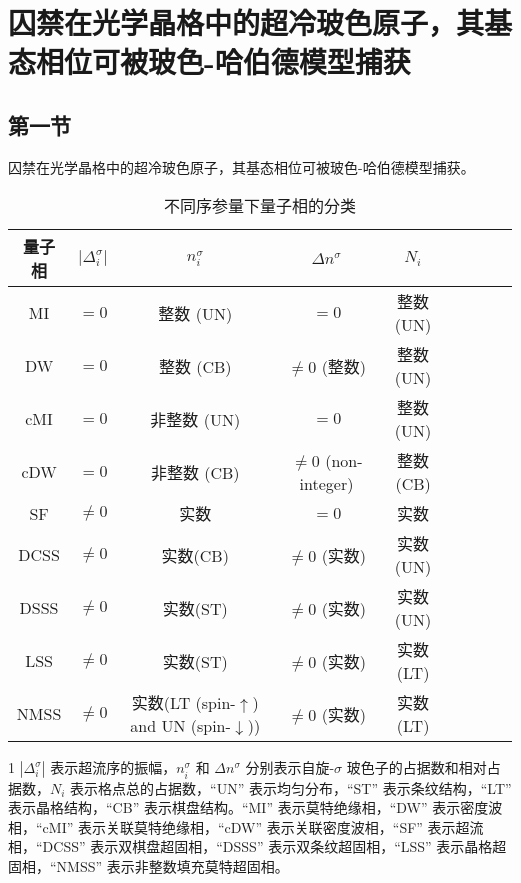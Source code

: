 \chapter{囚禁在光学晶格中的超冷玻色原子，其基态相位可被玻色-哈伯德模型捕获}

\section{第一节}
囚禁在光学晶格中的超冷玻色原子，其基态相位可被玻色-哈伯德模型捕获。

\makeatletter{}\makeatother
{\wuhao[1.5]
\begin{table*}
\centering \caption{不同序参量下量子相的分类}
\begin{tabular}{ccccccccc}
\hline\hline 量子相 &$|\Delta^{\sigma}_{i}|$ &
$n^{\sigma}_{i}$ & $\Delta n^{\sigma}$ & $N_{i}$
\\
\hline 
 MI &$=0$   &整数 (UN)& $=0$ & 整数 (UN) \\
 DW &$=0$   &整数 (CB)& $\neq0$ (整数) & 整数 (UN) \\
cMI &$=0$  &非整数 (UN)  & $=0$ & 整数(UN)  \\
cDW &$=0$  &非整数 (CB) & $\neq0$ (non-integer) & 整数(CB) \\
 SF &$\neq0$ & 实数 & $=0$ &实数 \\
DCSS  &$\neq0$ &实数(CB)& $\neq0$ (实数) & 实数(UN)\\
DSSS  &$\neq0$ &实数(ST)& $\neq0$ (实数) & 实数(UN)\\
 LSS  &$\neq0$ &实数(ST)& $\neq0$ (实数) & 实数(LT)\\
 NMSS  &$\neq0$ &实数(LT (spin-$\uparrow$) and UN (spin-$\downarrow$))& $\neq0$ (实数) & 实数(LT)\\
 \hline 
\end{tabular}
\begin{tablenotes}
       \footnotesize
       \item[1]{\(|\Delta_i^{\sigma}|\) 表示超流序的振幅，\(n_i^{\sigma}\) 和 \(\Delta n^{\sigma}\) 分别表示自旋-\(\sigma\) 玻色子的占据数和相对占据数，\(N_i\) 表示格点总的占据数，“UN” 表示均匀分布，“ST” 表示条纹结构，“LT” 表示晶格结构，“CB” 表示棋盘结构。“MI” 表示莫特绝缘相，“DW” 表示密度波相，“cMI” 表示关联莫特绝缘相，“cDW” 表示关联密度波相，“SF” 表示超流相，“DCSS” 表示双棋盘超固相，“DSSS” 表示双条纹超固相，“LSS” 表示晶格超固相，“NMSS” 表示非整数填充莫特超固相。}
     \end{tablenotes}
     \label{table:4-1}
\end{table*}
}

